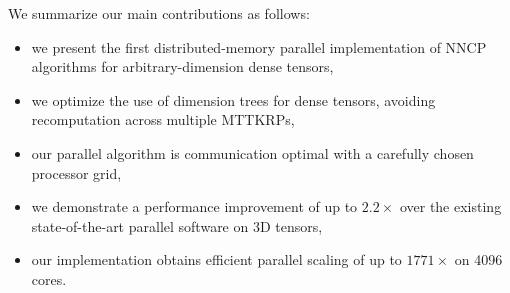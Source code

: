 We summarize our main contributions as follows:
\begin{itemize}
		\item we present the first distributed-memory parallel implementation of NNCP algorithms for arbitrary-dimension dense tensors,
		\item we optimize the use of dimension trees for dense tensors, avoiding recomputation across multiple MTTKRPs,
		\item our parallel algorithm is communication optimal with a carefully chosen processor grid,
		\item we demonstrate a performance improvement of up to $2.2\times$ over the existing state-of-the-art parallel software on 3D tensors,
		\item our implementation obtains efficient parallel scaling of up to $1771\times$ on 4096 cores.
\end{itemize}